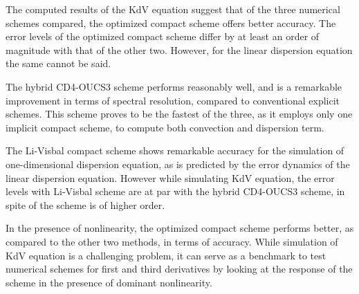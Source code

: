 \documentclass{svjour3}                    %
\begin{document}
The computed results of the KdV equation suggest that of the three numerical schemes compared, the optimized compact scheme offers better accuracy. The error levels of the optimized compact scheme differ by at least an order of magnitude with that of the other two. However, for the linear dispersion equation the same cannot be said.

 The hybrid CD4-OUCS3 scheme performs reasonably well, and is a remarkable improvement in terms of spectral resolution, compared to conventional explicit schemes. This scheme proves to be the fastest of the three, as it employs only one implicit compact scheme, to compute both convection and dispersion term.
 
 The Li-Visbal compact scheme shows remarkable accuracy for the simulation of one-dimensional dispersion equation, as is predicted by the error dynamics 
of the linear dispersion equation. However while simulating KdV equation, the error levels with Li-Visbal scheme are at par with the hybrid CD4-OUCS3 scheme, in spite of the scheme is of higher order.
 
  In the presence of nonlinearity, the optimized compact scheme performs better, as compared to the other two methods, in terms of accuracy. While simulation of KdV equation is a challenging problem, it can serve as a benchmark to test numerical schemes for first and third derivatives by looking 
at the response of the scheme in the presence of dominant nonlinearity.


%

\end{document}
